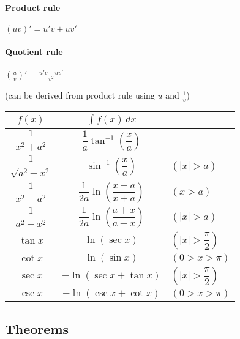\label{e0367fa}

\paragraph{Product rule} $(uv)'=u'v+uv'$


\paragraph{Quotient rule} $\displaystyle\left(\frac
uv\right)'=\frac{u'v-uv'}{v^2}$

(can be derived from product rule using $u$ and $\frac1v$)

\label{dbd3301}

\begin{center}
  \renewcommand{\arraystretch}{2.1}\def\d{\displaystyle}
  \begin{tabular}{c|c l}
    $f(x)$                    & $\int f(x)\,dx$                               &                    \\\hline
    $\dfrac1{x^2+a^2}$        & $\dfrac1a\tan^{-1}\left(\dfrac xa\right)$     &                    \\
    $\dfrac1{\sqrt{a^2-x^2}}$ & $\sin^{-1}\left(\dfrac xa\right)$             & $(|x|>a)$          \\
    $\dfrac1{x^2-a^2}$        & $\dfrac1{2a}\ln\left(\dfrac{x-a}{x+a}\right)$ & $(x>a)$            \\
    $\dfrac1{a^2-x^2}$        & $\dfrac1{2a}\ln\left(\dfrac{a+x}{a-x}\right)$ & $(|x|>a)$          \\
    $\tan x$                  & $\ln(\sec x)$                                 & $(|x|>\dfrac\pi2)$ \\
    $\cot x$                  & $\ln(\sin x)$                                 & $(0>x>\pi)$        \\
    $\sec x$                  & $-\ln(\sec x+\tan x)$                         & $(|x|>\dfrac\pi2)$ \\
    $\csc x$                  & $-\ln(\csc x+\cot x)$                         & $(0>x>\pi)$        \\
  \end{tabular}
\end{center}

\subsection{Theorems}\label{c17e64c}

